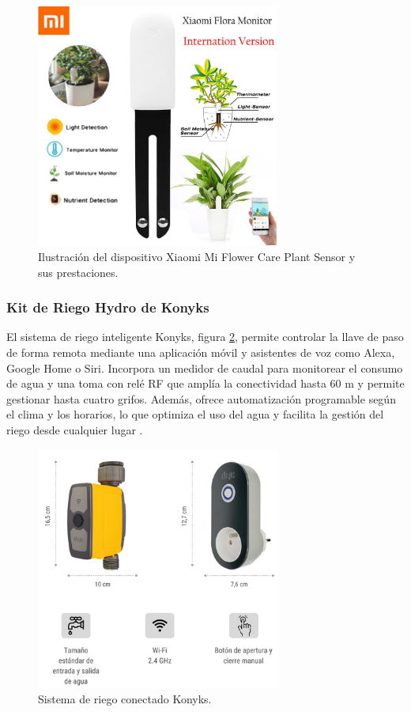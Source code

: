 \begin{figure}[h]
	\centering
	\includegraphics[height=8cm]{./Figures/xiaomi.jpg}
	\caption{Ilustración del dispositivo Xiaomi Mi Flower Care Plant Sensor y sus prestaciones.}
	\label{fig:xiaomi}
\end{figure}


\subsubsection{Kit de Riego Hydro de Konyks}
El sistema de riego inteligente Konyks, figura \ref{fig:kit_konyks}, permite controlar la llave de paso de forma remota mediante una aplicación móvil y asistentes de voz como Alexa, Google Home o Siri. Incorpora un medidor de caudal para monitorear el consumo de agua y una toma con relé RF que amplía la conectividad hasta 60 m y permite gestionar hasta cuatro grifos. Además, ofrece automatización programable según el clima y los horarios, lo que optimiza el uso del agua y facilita la gestión del riego desde cualquier lugar \cite{KONIX}.

\begin{figure}[h]
	\centering
	\includegraphics[height=8cm]{./Figures/kit_konyks.png}
	\caption{Sistema de riego conectado Konyks.}
	\label{fig:kit_konyks}
\end{figure}

